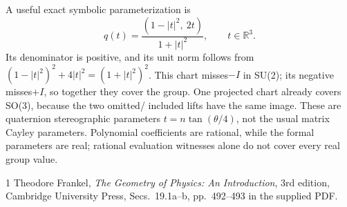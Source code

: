 \documentclass{article}
\newcommand{\R}{\mathbb{R}}
\begin{document}
A useful exact symbolic parameterization is
\[
 q(t)=\frac{(1-|t|^2,\ 2t)}{1+|t|^2},\qquad t\in\R^3 .
\]
Its denominator is positive, and its unit norm follows from
$(1-|t|^2)^2+4|t|^2=(1+|t|^2)^2$.
This chart misses$-I$ in SU(2); its negative misses$+I$, so together they cover
the group. One projected chart already covers SO(3), because the two omitted/
included lifts have the same image. These are quaternion stereographic
parameters $t=n\tan(\theta/4)$, not the usual matrix Cayley parameters.
Polynomial coefficients are rational, while the formal parameters are real;
rational evaluation witnesses alone do not cover every real group value.

\begin{thebibliography}{1}
Theodore Frankel, \emph{The Geometry of Physics: An Introduction},
3rd edition, Cambridge University Press, Secs.~19.1a--b,
pp.~492--493 in the supplied PDF.
\end{thebibliography}
\end{document}
